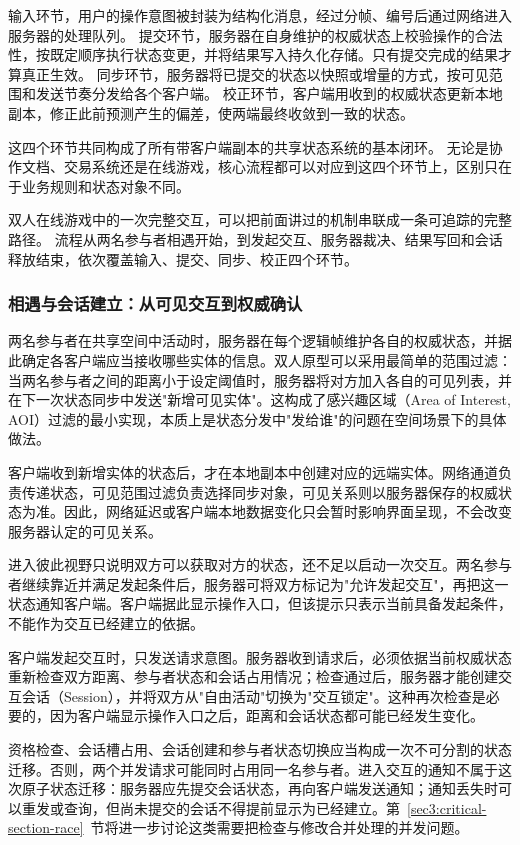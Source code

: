 输入环节，用户的操作意图被封装为结构化消息，经过分帧、编号后通过网络进入服务器的处理队列。
提交环节，服务器在自身维护的权威状态上校验操作的合法性，按既定顺序执行状态变更，并将结果写入持久化存储。只有提交完成的结果才算真正生效。
同步环节，服务器将已提交的状态以快照或增量的方式，按可见范围和发送节奏分发给各个客户端。
校正环节，客户端用收到的权威状态更新本地副本，修正此前预测产生的偏差，使两端最终收敛到一致的状态。

这四个环节共同构成了所有带客户端副本的共享状态系统的基本闭环。
无论是协作文档、交易系统还是在线游戏，核心流程都可以对应到这四个环节上，区别只在于业务规则和状态对象不同。

双人在线游戏中的一次完整交互，可以把前面讲过的机制串联成一条可追踪的完整路径。
流程从两名参与者相遇开始，到发起交互、服务器裁决、结果写回和会话释放结束，依次覆盖输入、提交、同步、校正四个环节。

\subsubsection{相遇与会话建立：从可见交互到权威确认}\label{sec2:before-battle}

两名参与者在共享空间中活动时，服务器在每个逻辑帧维护各自的权威状态，并据此确定各客户端应当接收哪些实体的信息。双人原型可以采用最简单的范围过滤：当两名参与者之间的距离小于设定阈值时，服务器将对方加入各自的可见列表，并在下一次状态同步中发送"新增可见实体"。这构成了感兴趣区域（Area of Interest, AOI）过滤的最小实现，本质上是状态分发中"发给谁"的问题在空间场景下的具体做法。

客户端收到新增实体的状态后，才在本地副本中创建对应的远端实体。网络通道负责传递状态，可见范围过滤负责选择同步对象，可见关系则以服务器保存的权威状态为准。因此，网络延迟或客户端本地数据变化只会暂时影响界面呈现，不会改变服务器认定的可见关系。

进入彼此视野只说明双方可以获取对方的状态，还不足以启动一次交互。两名参与者继续靠近并满足发起条件后，服务器可将双方标记为"允许发起交互"，再把这一状态通知客户端。客户端据此显示操作入口，但该提示只表示当前具备发起条件，不能作为交互已经建立的依据。

客户端发起交互时，只发送请求意图。服务器收到请求后，必须依据当前权威状态重新检查双方距离、参与者状态和会话占用情况；检查通过后，服务器才能创建交互会话（Session），并将双方从"自由活动"切换为"交互锁定"。这种再次检查是必要的，因为客户端显示操作入口之后，距离和会话状态都可能已经发生变化。

资格检查、会话槽占用、会话创建和参与者状态切换应当构成一次不可分割的状态迁移。否则，两个并发请求可能同时占用同一名参与者。进入交互的通知不属于这次原子状态迁移：服务器应先提交会话状态，再向客户端发送通知；通知丢失时可以重发或查询，但尚未提交的会话不得提前显示为已经建立。第~\ref{sec3:critical-section-race}~节将进一步讨论这类需要把检查与修改合并处理的并发问题。

